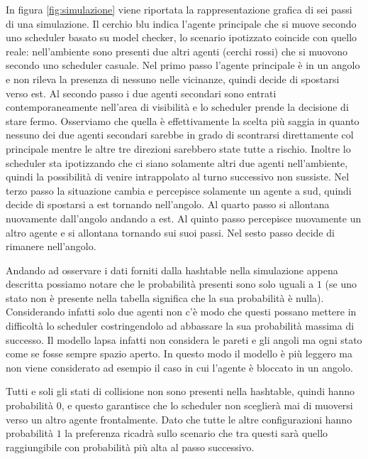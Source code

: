 In figura \ref{fig:simulazione} viene riportata la rappresentazione grafica di sei passi di una simulazione. Il cerchio blu indica l'agente principale che si muove secondo uno scheduler basato su model checker, lo scenario ipotizzato coincide con quello reale: nell'ambiente sono presenti due altri agenti (cerchi rossi) che si muovono secondo uno scheduler casuale. Nel primo passo l'agente principale è in un angolo e non rileva la presenza di nessuno nelle vicinanze, quindi decide di spostarsi verso est. Al secondo passo i due agenti secondari sono entrati contemporaneamente nell'area di visibilità e lo scheduler prende la decisione di stare fermo. Osserviamo che quella è effettivamente la scelta più saggia in quanto nessuno dei due agenti secondari sarebbe in grado di scontrarsi direttamente col principale mentre le altre tre direzioni sarebbero state tutte a rischio. Inoltre lo scheduler sta ipotizzando che ci siano solamente altri due agenti nell'ambiente, quindi la possibilità di venire intrappolato al turno successivo non sussiste. Nel terzo passo la situazione cambia e percepisce solamente un agente a sud, quindi decide di spostarsi a est tornando nell'angolo. Al quarto passo si allontana nuovamente dall'angolo andando a est. Al quinto passo percepisce nuovamente un altro agente e si allontana tornando sui suoi passi. Nel sesto passo decide di rimanere nell'angolo.

Andando ad osservare i dati forniti dalla hashtable nella simulazione appena descritta possiamo notare che le probabilità presenti sono solo uguali a $1$ (se uno stato non è presente nella tabella significa che la sua probabilità è nulla). Considerando infatti solo due agenti non c'è modo che questi possano mettere in difficoltà lo scheduler costringendolo ad abbassare la sua probabilità massima di successo. Il modello \ac{lapsa} infatti non considera le pareti e gli angoli ma ogni stato come se fosse sempre spazio aperto. In questo modo il modello è più leggero ma non viene considerato ad esempio il caso in cui l'agente è bloccato in un angolo.

Tutti e soli gli stati di collisione non sono presenti nella hashtable, quindi hanno probabilità $0$, e questo garantisce che lo scheduler non sceglierà mai di muoversi verso un altro agente frontalmente. Dato che tutte le altre configurazioni hanno probabilità $1$ la preferenza ricadrà sullo scenario che tra questi sarà quello raggiungibile con probabilità più alta al passo successivo.


